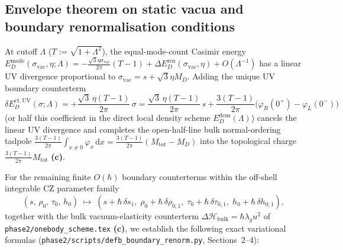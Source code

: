 \documentclass[11pt,a4paper]{article}
\theoremstyle{remark}
\newcommand{\hb}{\hbar}
\newcommand{\dd}{\mathrm{d}}
\newcommand{\Lc}{\textbf{(c)}}
\newcommand{\sren}{\texttt{phase2/\allowbreak scripts/\allowbreak defb\_\allowbreak boundary\_\allowbreak renorm.py}}
\begin{document}
\subsection{Envelope theorem on static vacua and boundary renormalisation conditions}

At cutoff $\Lambda$ ($T := \sqrt{1+\Lambda^2}$), the equal-mode-count Casimir
energy $E_D^{\mathrm{mode}}(\sigma_{\mathrm{vac}},\eta;\Lambda) = -\frac{\sqrt{3}\eta\sigma_{\mathrm{vac}}}{2\pi}(T-1) + \Delta E_D^{\mathrm{ren}}(\sigma_{\mathrm{vac}},\eta) + O(\Lambda^{-1})$
has a linear UV divergence proportional to
$\sigma_{\mathrm{vac}} = s + \sqrt{3}\eta M_D$. Adding the unique UV boundary
counterterm
\begin{equation}\label{eq:UV_bdry_ct}
  \delta E_D^{\mathrm{ct,UV}}(\sigma;\Lambda)
  = +\frac{\sqrt{3}\,\eta(T-1)}{2\pi}\,\sigma
  = \frac{\sqrt{3}\,\eta(T-1)}{2\pi}\,s + \frac{3(T-1)}{2\pi}\big(\varphi_R(0^+) - \varphi_L(0^-)\big)
\end{equation}
(or half this coefficient in the direct local density scheme
$E_D^{\mathrm{dens}}(\Lambda)$) cancels the linear UV divergence and completes
the open-half-line bulk normal-ordering tadpole
$\frac{3(T-1)}{2\pi}\int_{x\ne 0}\varphi_x\,\dd x = \frac{3(T-1)}{2\pi}(M_{\mathrm{tot}} - M_D)$
into the topological charge $\frac{3(T-1)}{2\pi}M_{\mathrm{tot}}$ \Lc.

For the remaining finite $O(\hb)$ boundary counterterms within the off-shell
integrable CZ parameter family
\begin{equation}\label{eq:cz_param_shift}
  (s,\,\rho_0,\,\tau_0,\,h_0) \;\longmapsto\;
  (s + \hb\,\delta s_1,\;\rho_0 + \hb\,\delta\rho_{0,1},\;\tau_0 + \hb\,\delta\tau_{0,1},\;h_0 + \hb\,\delta h_{0,1}),
\end{equation}
together with the bulk vacuum-elasticity counterterm
$\Delta\mathcal{H}_{\mathrm{bulk}} = \hb\lambda_g u^2$ of
\texttt{phase2/onebody\_scheme.tex} \Lc, we establish the following exact
variational formulas (\sren, Sections~2--4):
\end{document}
